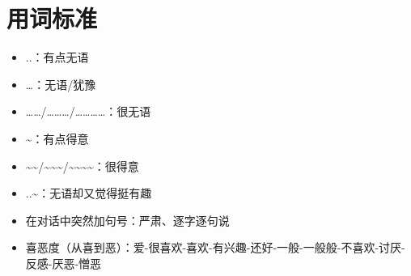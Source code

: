 \documentclass[UTF8]{ctexart}
\begin{document}
\section{用词标准}
\begin{itemize}
\item ..：有点无语
\item …：无语/犹豫
\item ……/………/…………：很无语
\item \~{}：有点得意
\item \~{}\~{}/\~{}\~{}\~{}/\~{}\~{}\~{}\~{}：很得意
\item ..\~{}：无语却又觉得挺有趣
\item 在对话中突然加句号：严肃、逐字逐句说
\item 喜恶度（从喜到恶）：爱-很喜欢-喜欢-有兴趣-还好-一般-一般般-不喜欢-讨厌-反感-厌恶-憎恶
\end{itemize}
\end{document}
